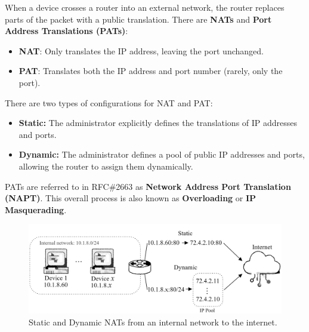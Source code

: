\vspace{-.5em}
\begin{Def}

    When a device crosses a router into an external network, the router replaces parts of the packet with a public translation.
    There are \textbf{NATs} and \textbf{Port Address Translations (PATs)}:

    \begin{itemize}
        \item \textbf{NAT}: Only translates the IP address, leaving the port unchanged.
        \item \textbf{PAT}: Translates both the IP address and port number (rarely, only the port).
    \end{itemize}

    \noindent
    There are two types of configurations for NAT and PAT:
    \begin{itemize}
        \item \textbf{Static:} The administrator explicitly defines the translations of IP addresses and ports.
        \item \textbf{Dynamic:} The administrator defines a pool of public IP addresses and ports, allowing the router to assign them dynamically.
    \end{itemize}

    \noindent
    PATs are referred to in RFC\#2663 as \textbf{Network Address Port Translation (NAPT)}. This overall process is also known as \textbf{Overloading} or 
    \textbf{IP Masquerading}. \hfill \cite{rfc2663}

\end{Def}

\begin{figure}[h!]

    \vspace{-1.25em}
    \hspace{-1em}
    \includegraphics[width=1\textwidth]{Sections/network/nat.png}
    \caption{Static and Dynamic NATs from an internal network to the internet.}
    \label{fig:nat}
\end{figure}

